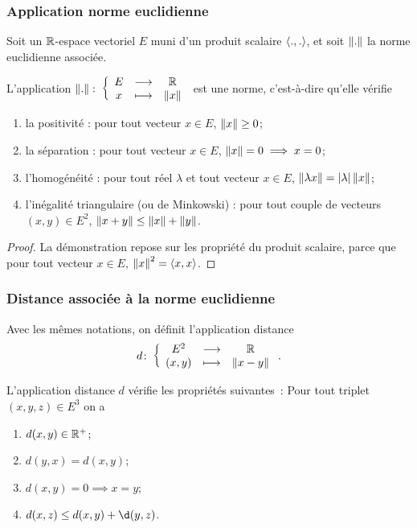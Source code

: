 \subsubsection{Application norme euclidienne}

Soit un $\mathbb{R}$-espace vectoriel $E$ muni d'un produit scalaire $\left\langle{.},{.}\right\rangle$, et soit $\left\lVert.\right\rVert$ la norme euclidienne associée.

\begin{prop}
  L'application $\left\lVert.\right\rVert\colon \left\{\begin{array}{ccc} E & \longrightarrow &\mathbb{R}\\ x & \longmapsto & \left\lVert x\right\rVert \end{array} \right.$ est une norme, c'est-à-dire qu'elle vérifie
  \begin{enumerate}
  \item la positivité : pour tout vecteur $x \in E$, $\left\lVert x\right\rVert \geq 0$;
  \item la séparation : pour tout vecteur $x \in E$, $\left\lVert x\right\rVert= 0 \implies x=0$;
  \item l'homogénéité : pour tout réel $\lambda$ et tout vecteur $x \in E$, $\left\lVert\lambda x\right\rVert=\left\lvert\lambda\right\rvert\left\lVert x\right\rVert$;
  \item l'inégalité triangulaire (ou de Minkowski) : pour tout couple de vecteurs $(x,y) \in E^2$, $\left\lVert x+y\right\rVert\leq \left\lVert x\right\rVert+\left\lVert y\right\rVert$.
  \end{enumerate}
\end{prop}
\begin{proof}
  La démonstration repose sur les propriété du produit scalaire, parce que pour tout vecteur $x \in E$, $\left\lVert x\right\rVert^2 = \left\langle{x},{x}\right\rangle$.
\end{proof}

\subsubsection{Distance associée à la norme euclidienne}

Avec les mêmes notations, on définit l'application distance
\begin{equation}
  d\colon \left\{\begin{array}{ccc} E^2 & \longrightarrow &\mathbb{R}\\ (x,y) & \longmapsto & \left\lVert x-y\right\rVert \end{array} \right..
\end{equation}
% 
\begin{prop}
  L'application distance $d$ vérifie les propriétés suivantes~: Pour tout triplet $(x,y,z) \in E^3$ on a
  \begin{enumerate}
  \item $d(x,y) \in \mathbb{R}^{+}$;
  \item $d(y,x)=d(x,y)$;
  \item $d(x,y)=0 \implies x=y$;
  \item $d(x,z)\leq d(x,y)+\d(y,z)$.
  \end{enumerate}
\end{prop}


